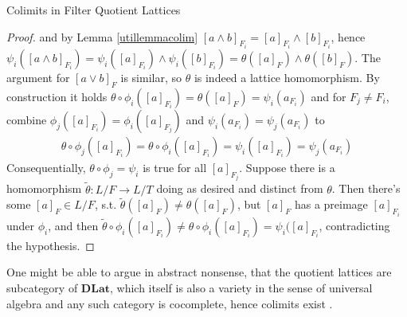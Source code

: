 \begin{subsection}{Colimits in Filter Quotient Lattices}
\begin{proof}
        and by Lemma \ref{utillemmacolim} \( [a \wedge b]_{F_i} = [a]_{F_i} \wedge [b]_{F_i} \), hence
        \( \psi_i([a \wedge b]_{F_i}) = \psi_i([a]_{F_i}) \wedge \psi_i([b]_{F_i}) = \theta([a]_{F}) \wedge \theta([b]_{F}) \).
        The argument for \( [a \vee b]_F \) is similar, so \( \theta \) is indeed a lattice homomorphism.
        \newline
        By construction it holds \( \theta \circ \phi_i([a]_{F_i}) = \theta([a]_{F}) = \psi_i(a_{F_i}) \) and for \( F_j \neq F_i \), 
        combine \( \phi_j([a]_{F_i}) = \phi_i([a]_{F_j}) \) and \( \psi_i(a_{F_i}) = \psi_j(a_{F_i}) \) to 
        \begin{align*}
            \theta \circ \phi_j([a]_{F_i}) = \theta \circ \phi_i([a]_{F_i}) = \psi_i([a]_{F_i}) = \psi_j(a_{F_i})
        \end{align*}
        Consequentially, \( \theta \circ \phi_j = \psi_i \) is true for all \( [a]_{F_j} \).
        \newline
        Suppose there is a homomorphism \( \tilde{\theta} : L / F \to L / T \) doing as desired and distinct from \( \theta \).
        Then there's some \( [a]_F \in L / F \), s.t. \( \tilde{\theta}([a]_F) \neq \theta([a]_F) \), 
        but \( [a]_F \) has a preimage \( [a]_{F_i} \) under \( \phi_i \),
        and then \( \tilde{\theta} \circ \phi_i ([a]_{F_i}) \neq \theta \circ \phi_i([a]_{F_i}) = \psi_{i}([a]_{F_i} \), 
        contradicting the hypothesis. 
    \end{proof}
    One might be able to argue in abstract nonsense, that the quotient lattices are subcategory of \( \textbf{DLat} \),
    which itself is also a variety in the sense of universal algebra and any such category is cocomplete, hence colimits exist \cite{univalgarecocomplete}.
\end{subsection}
